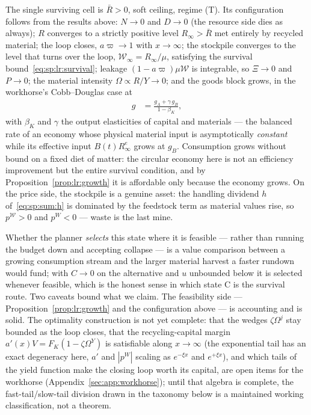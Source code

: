  The single surviving cell is $\bar R>0$, soft ceiling, regime (T). Its configuration follows from the results above: $N\to0$ and $D\to0$ (the resource side dies as always); $R$ converges to a strictly positive level $R_\infty>\bar R$ met entirely by recycled material; the loop closes, $a\varpi\to1$ with $x\to\infty$; the stockpile converges to the level that turns over the loop, $\mathcal W_\infty=R_\infty/\mu$, satisfying the survival bound~\eqref{eq:sp:lr:survival}; leakage $\left(1-a\varpi\right)\mu\mathcal W$ is integrable, so $\Xi\to0$ and $P\to0$; the material intensity $\Omega\propto R/Y\to0$; and the goods block grows, in the workhorse's Cobb--Douglas case at
\begin{align}
g &= \frac{g_A+\gamma\,g_B}{1-\beta_K},
\label{eq:sp:lr:c2-growth}
\end{align}
with $\beta_K$ and $\gamma$ the output elasticities of capital and materials --- the balanced rate of an economy whose physical material input is asymptotically \emph{constant} while its effective input $B\left(t\right)R^e_\infty$ grows at $g_B$. Consumption grows without bound on a fixed diet of matter: the circular economy here is not an efficiency improvement but the entire survival condition, and by Proposition~\ref{prop:lr:growth} it is affordable only because the economy grows. On the price side, the stockpile is a genuine asset: the handling dividend $h$ of~\eqref{eq:sp:sum:h} is dominated by the feedstock term as material values rise, so $p^{\mathcal W}>0$ and $p^W<0$ --- waste is the last mine.

Whether the planner \emph{selects} this state where it is feasible --- rather than running the budget down and accepting collapse --- is a value comparison between a growing consumption stream and the larger material harvest a faster rundown would fund; with $C\to0$ on the alternative and $u$ unbounded below it is selected whenever feasible, which is the honest sense in which state C is the survival route. Two caveats bound what we claim. The feasibility side --- Proposition~\ref{prop:lr:growth} and the configuration above --- is accounting and is solid. The optimality construction is not yet complete: that the wedges $\zeta\Omega^j$ stay bounded as the loop closes, that the recycling-capital margin $a'\left(x\right)V=F_K\left(1-\zeta\Omega^Y\right)$ is satisfiable along $x\to\infty$ (the exponential tail has an exact degeneracy here, $a'$ and $\left|p^W\right|$ scaling as $e^{-\xi x}$ and $e^{+\xi x}$), and which tails of the yield function make the closing loop worth its capital, are open items for the workhorse (Appendix~\ref{sec:app:workhorse}); until that algebra is complete, the fast-tail/slow-tail division drawn in the taxonomy below is a maintained working classification, not a theorem.

